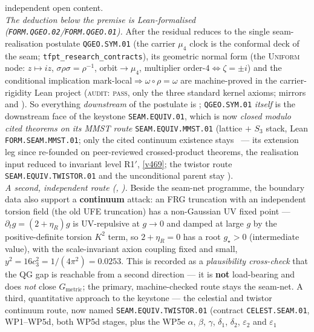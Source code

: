\documentclass[11pt,a4paper]{article}
\newcommand{\cthree}{c_3}
\begin{document}
\begin{keybox}
independent open content. 
\smallskip\\
\noindent\emph{The deduction below the premise is Lean-formalised (\texttt{FORM.QGEO.02}/\texttt{FORM.QGEO.01}).}
After the residual reduces to the single seam-realisation postulate \texttt{QGEO.SYM.01} (the carrier
$\mu_4$ clock is the conformal deck of the seam; \texttt{tfpt\_research\_contracts}), its geometric normal
form (the \textsc{Uniform} node: $z\mapsto iz$, $\sigma\rho\sigma=\rho^{-1}$, orbit$\to\mu_4$, multiplier
order-$4\Leftrightarrow\zeta{=}\pm i$) and the conditional implication mark-local$\Rightarrow\omega\circ
\rho=\omega$ are machine-proved in the carrier-rigidity Lean project (\textsc{audit: pass}, only the three
standard kernel axioms; mirrors  and ).
So everything \emph{downstream} of the postulate is \mE; \texttt{QGEO.SYM.01} \emph{itself} is the downstream
face of the keystone \texttt{SEAM.EQUIV.01}, which is now \emph{closed modulo cited theorems on its MMST route}
\texttt{SEAM.EQUIV.MMST.01} (lattice $+$ $S_3$
stack, Lean \texttt{FORM.SEAM.MMST.01}; only the cited continuum existence stays \mO\ --- its extension leg since
re-founded on peer-reviewed crossed-product theorems, the realisation input reduced to invariant level R1$'$,
\vref{v469}; the twistor route \texttt{SEAM.EQUIV.TWISTOR.01} and the unconditional parent stay \mO).
\smallskip\\
\noindent\emph{A second, independent route (, \mO).} Beside the seam-net
programme, the boundary data also support a \textbf{continuum} attack: an FRG truncation with an independent
torsion field (the old UFE truncation) has a non-Gaussian UV fixed point --- $\partial_t g=(2+\eta_R)g$ is
UV-repulsive at $g\!\to\!0$ and damped at large $g$ by the positive-definite torsion $K^2$ term, so
$2+\eta_R=0$ has a root $g_\star>0$ (intermediate value), with the scale-invariant axion coupling fixed and
small, $y^2=16\cthree^2=1/(4\pi^2)=0.0253$. This is recorded as a \emph{plausibility cross-check} that the
QG gap is reachable from a second direction --- it is \textbf{not} load-bearing and does \emph{not} close
$G_{\mathrm{metric}}$; the primary, machine-checked route stays the seam-net. A third, quantitative
approach to the keystone --- the celestial and twistor continuum route, now named
\texttt{SEAM.EQUIV.TWISTOR.01} (contract \texttt{CELEST.SEAM.01}, WP1--WP5d, both
WP5d stages, plus the
WP5e $\alpha$, $\beta$, $\gamma$, $\delta_1$, $\delta_2$, $\varepsilon_2$ and $\varepsilon_1$

\end{keybox}
\end{document}
